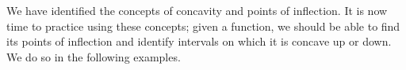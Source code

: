 %
%
%
%
%
%
%
%

We have identified the concepts of concavity and points of inflection. It is now time to practice using these concepts; given a function, we should be able to find its points of inflection and identify intervals on which it is concave up or down. We do so in the following examples.


